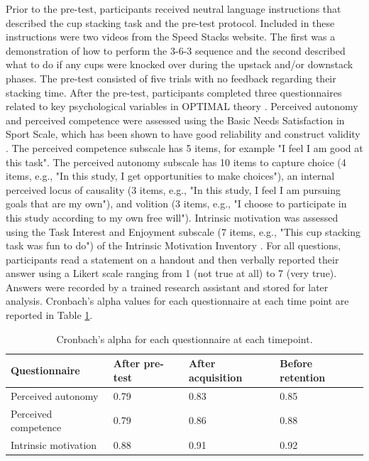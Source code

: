 \documentclass[doc,floatsintext,donotrepeattitle,letterpaper,12pt]{apa7}
\begin{document}
Prior to the pre-test, participants received neutral language instructions that described the cup stacking task and the pre-test protocol. Included in these instructions were two videos from the Speed Stacks website. The first was a demonstration of how to perform the 3-6-3 sequence and the second described what to do if any cups were knocked over during the upstack and/or downstack phases. The pre-test consisted of five trials with no feedback regarding their stacking time. After the pre-test, participants completed three questionnaires related to key psychological variables in OPTIMAL theory \autocite{wulf2016}. Perceived autonomy and perceived competence were assessed using the Basic Needs Satisfaction in Sport Scale, which has been shown to have good reliability and construct validity \autocite{ng2011}. The perceived competence subscale has 5 items, for example "I feel I am good at this task". The perceived autonomy subscale has 10 items to capture choice (4 items, e.g., "In this study, I get opportunities to make choices"), an internal perceived locus of causality (3 items, e.g., "In this study, I feel I am pursuing goals that are my own"), and volition (3 items, e.g., "I choose to participate in this study according to my own free will"). Intrinsic motivation was assessed using the Task Interest and Enjoyment subscale (7 items, e.g., "This cup stacking task was fun to do") of the Intrinsic Motivation Inventory \autocite{mcauley1989}. For all questions, participants read a statement on a handout and then verbally reported their answer using a Likert scale ranging from 1 (not true at all) to 7 (very true). Answers were recorded by a trained research assistant and stored for later analysis. Cronbach's alpha values for each questionnaire at each time point are reported in Table \ref{tab:table1}.

\begin{table}[htb]
    \caption{Cronbach's alpha for each questionnaire at each timepoint.}
    \label{tab:table1}
    \small
    \begin{tabular}{@{}llll@{}}
    \toprule
    Questionnaire        & After pre-test & After acquisition & Before retention \\
    \midrule
    Perceived autonomy   & 0.79           & 0.83              & 0.85             \\
    Perceived competence & 0.79           & 0.86              & 0.88             \\
    Intrinsic motivation & 0.88           & 0.91              & 0.92             \\
    \bottomrule
    \end{tabular}
\end{table}
\end{document}
